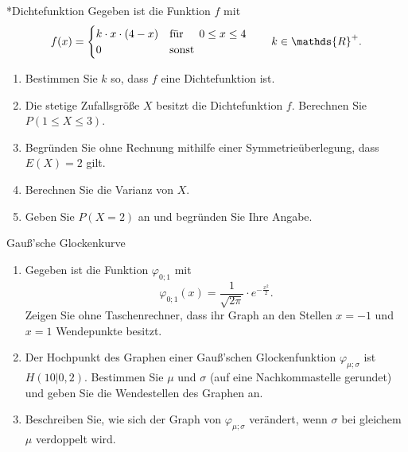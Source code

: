
\begin{uebung}*{Dichtefunktion}
Gegeben ist die Funktion $f$ mit
$$f(x)= \begin{cases}
              k\cdot x\cdot(4-x) & \text{für}\hspace{0.5cm} 0\leq x\leq 4\\
              0 & \text{sonst}
         \end{cases}\qquad k\in\mathds{R}^+.$$
\begin{enumerate}[label=\alph*)]
  \item Bestimmen Sie $k$ so, dass $f$ eine Dichtefunktion ist.
  \item Die stetige Zufallsgröße $X$ besitzt die Dichtefunktion $f$. Berechnen Sie $P(1\leq X\leq 3)$.
  \item Begründen Sie ohne Rechnung mithilfe einer Symmetrieüberlegung, dass $E(X)=2$ gilt.
  \item Berechnen Sie die Varianz von $X$.
  \item Geben Sie $P(X=2)$ an und begründen Sie Ihre Angabe.
\end{enumerate}
\end{uebung}

\begin{uebung}{Gauß'sche Glockenkurve}
\begin{enumerate}[label=\alph*)]
  \item Gegeben ist die Funktion $\varphi_{0;1}$ mit \[\varphi_{0;1}(x) = \dfrac{1}{\sqrt{2\pi}}\cdot e^{-\frac{x^2}{2}}.\] Zeigen Sie ohne Taschenrechner, dass ihr Graph an den Stellen $x=-1$ und $x=1$ Wendepunkte besitzt.
  \item Der Hochpunkt des Graphen einer Gauß'schen Glockenfunktion $\varphi_{\mu;\sigma}$ ist $H(10|0{,}2)$. Bestimmen Sie $\mu$ und $\sigma$ (auf eine Nachkommastelle gerundet) und geben Sie die Wendestellen des Graphen an.
  \item Beschreiben Sie, wie sich der Graph von $\varphi_{\mu;\sigma}$ verändert, wenn $\sigma$ bei gleichem $\mu$ verdoppelt wird.
\end{enumerate}
\end{uebung}

